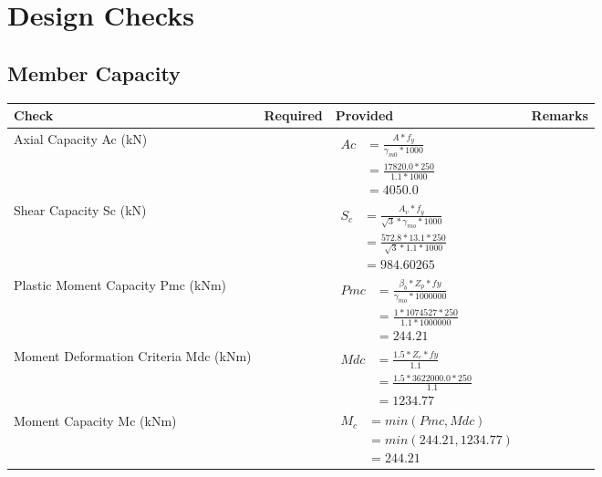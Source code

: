 \documentclass{article}%
\begin{document}
%
%
\newpage%
\section{Design Checks}%
\label{sec:DesignChecks}%
\subsection{Member Capacity}%
\label{subsec:MemberCapacity}%
\renewcommand{\arraystretch}{1.2}%
\begin{longtable}{|p{4cm}|p{5cm}|p{5.5cm}|p{1.5cm}|}%
\hline%
\rowcolor{OsdagGreen}%
Check&Required&Provided&Remarks\\%
\hline%
\endhead%
\hline%
Axial Capacity Ac (kN)&&$\begin{aligned} Ac &=\frac{A*f_y}{\gamma_{m0} *1000}\\ &=\frac{17820.0*250}{1.1* 1000}\\ &=4050.0\end{aligned}$&\\%
\hline%
Shear Capacity Sc (kN)&&$\begin{aligned} S_c &= \frac{A_v*f_y}{\sqrt{3}*\gamma_{mo} *1000}\\ &=\frac{572.8*13.1*250}{\sqrt{3}*1.1 *1000}\\ &=984.60265\end{aligned}$&\\%
\hline%
Plastic Moment Capacity Pmc (kNm)&&$\begin{aligned} Pmc &= \frac{\beta_b * Z_p *fy}{\gamma_{mo} * 1000000}\\ &=\frac{1*1074527*250}{1.1 * 1000000}\\ &=244.21\end{aligned}$&\\%
\hline%
Moment Deformation Criteria Mdc (kNm)&&$\begin{aligned} Mdc &= \frac{1.5 *Z_e *fy}{1.1}\\ &= \frac{1.5 *3622000.0*250}{1.1}\\ &= 1234.77\end{aligned}$&\\%
\hline%
Moment Capacity Mc (kNm)&&$\begin{aligned} M_c &= min(Pmc,Mdc)\\ &=min(244.21,1234.77)\\ &=244.21\end{aligned}$&\\%
\hline%
\end{longtable}
\end{document}
